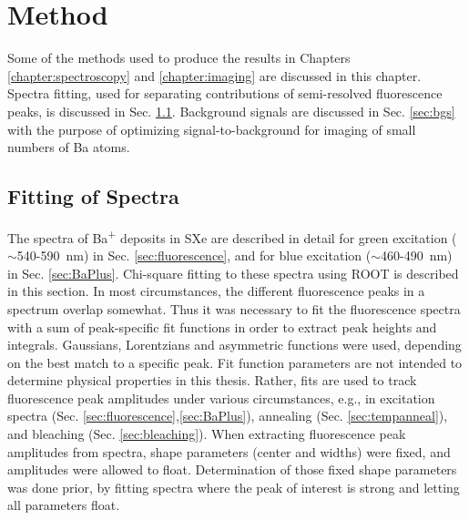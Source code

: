 \chapter{Method}

Some of the methods used to produce the results in Chapters \ref{chapter:spectroscopy} and \ref{chapter:imaging} are discussed in this chapter.  Spectra fitting, used for separating contributions of semi-resolved fluorescence peaks, is discussed in Sec. \ref{sec:fitting}.  Background signals are discussed in Sec. \ref{sec:bgs} with the purpose of optimizing signal-to-background for imaging of small numbers of Ba atoms.

\section{Fitting of Spectra}
\label{sec:fitting} %

The spectra of Ba\textsuperscript{+} deposits in SXe are described in detail for green excitation ($\sim$540-590~nm) in Sec. \ref{sec:fluorescence}, and for blue excitation ($\sim$460-490~nm) in Sec. \ref{sec:BaPlus}.  Chi-square fitting to these spectra using ROOT is described in this section.  In most circumstances, the different fluorescence peaks in a spectrum overlap somewhat.  Thus it was necessary to fit the fluorescence spectra with a sum of peak-specific fit functions in order to extract peak heights and integrals.  Gaussians, Lorentzians and asymmetric functions were used, depending on the best match to a specific peak.  Fit function parameters are not intended to determine physical properties in this thesis.  Rather, fits are used to track fluorescence peak amplitudes under various circumstances, e.g., in excitation spectra (Sec. \ref{sec:fluorescence},\ref{sec:BaPlus}), annealing (Sec. \ref{sec:tempanneal}), and bleaching (Sec. \ref{sec:bleaching}).  When extracting fluorescence peak amplitudes from spectra, shape parameters (center and widths) were fixed, and amplitudes were allowed to float.  Determination of those fixed shape parameters was done prior, by fitting spectra where the peak of interest is strong and letting all parameters float.


